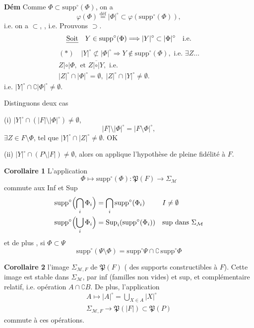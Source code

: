 \documentclass[11pt,a4paper]{article}
\begin{document}
\textbf{Dém} Comme  $\Phi \subset \mathrm{supp}^\circ(\Phi)$, on a \struck{$\varphi(\Phi)=$}
\[
\varphi(\Phi) \overset{\text{déf}}{=} |\Phi|^\circ \subset \varphi(\mathrm{supp}^\circ(\Phi)) ,
\]
i.e. on a $\subset$, , i.e. Prouvons $\supset$.
\[
\text{\uncertain{Soit}}\quad Y \in \mathrm{supp}^\circ(\Phi) \Longrightarrow |Y|^\circ \subset |\Phi|^\circ \quad \text{i.e.}
\]
\[
\begin{gathered}
(*)\quad |Y|^\circ \not\subset |\Phi|^\circ \Longrightarrow Y \notin \mathrm{supp}^\circ(\Phi), \text{ i.e. } \exists Z \ldots\\
Z \mathrel{|{\circ}|} \Phi, \text{ et } Z \mathrel{\overline{|\circ|}} Y, \text{ i.e.}\\
|Z|^\circ \cap |\Phi|^\circ = \emptyset,\; |Z|^\circ\cap|Y|^\circ \neq \emptyset .
\end{gathered}
\]
i.e. $|Y|^\circ \cap \complement|\Phi|^\circ \neq \emptyset$.

Distinguons deux cas

(i) $|Y|^\circ \cap (|F| \setminus |\Phi|^\circ) \neq \emptyset$, 
\[
|F|\setminus|\Phi|^\circ = |F\setminus\Phi|^\circ ,
\]
$\exists Z \in F\setminus\Phi$, tel que $|Y|^\circ \cap |Z|^\circ \neq \emptyset$. OK

(ii) $|Y|^\circ \cap (P\setminus|F|) \neq \emptyset$, alors on applique l'hypothèse de pleine fidélité à $F$.


\textbf{Corollaire 1} L'application
\[
\Phi \longmapsto \mathrm{supp}^\circ(\Phi) : \mathfrak{P}(F) \longrightarrow \Sigma_{\mathcal{M}}
\]
commute aux Inf et Sup
\[
\begin{aligned}
\mathrm{supp}^\circ\Bigl(\bigcap_i \Phi_i\Bigr) &= \bigcap_i \mathrm{supp}^\circ(\Phi_i) && I \neq \emptyset\\
\mathrm{supp}^\circ\Bigl(\bigcup_i \Phi_i\Bigr) &= \operatorname{Sup}_i(\mathrm{supp}^\circ(\Phi_i)) && \text{sup dans } \Sigma_{\mathcal{M}}
\end{aligned}
\]
et de plus , si $\Phi \subset \Psi$
\[
\mathrm{supp}^\circ(\Psi\setminus\Phi) = \mathrm{supp}^\circ\Psi \cap \complement\,\mathrm{supp}^\circ\Phi
\]

\textbf{Corollaire 2}   l'image $\Sigma_{\mathcal{M},F}$ de $\mathfrak{P}(F)$ ( des supports constructibles  à $F$). Cette image est stable dans $\Sigma_{\mathcal{M}}$, par inf (familles non vides) et sup, et complémentaire relatif, i.e. opération $A \cap \complement B$. De plus, l'application 
\[
\begin{gathered}
A \longmapsto |A|^\circ = \bigcup_{X\in A} |X|^\circ\\
\Sigma_{\mathcal{M},F} \longrightarrow \mathfrak{P}(|F|) \subset \mathfrak{P}(P)
\end{gathered}
\]
commute à ces opérations.
\end{document}
